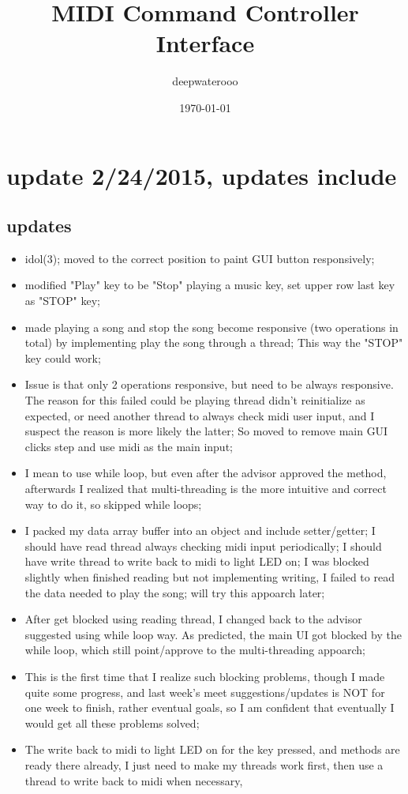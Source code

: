 \documentclass[9pt,b5paper]{article}
\author{deepwaterooo}
\date{\today}
\title{MIDI Command Controller Interface}
\begin{document}
\maketitle
\tableofcontents


\section{update 2/24/2015, updates include}
\label{sec-1}
\subsection{updates}
\label{sec-1-1}
\begin{itemize}
\item idol(3); moved to the correct position to paint GUI button responsively;
\item modified "Play" key to be "Stop" playing a music key, set upper row last key as "STOP" key;
\item made playing a song and stop the song become responsive (two operations in total) by implementing play the song through a thread; This way the "STOP" key could work;
\item Issue is that only 2 operations responsive, but need to be always responsive. The reason for this failed could be playing thread didn't reinitialize as expected, or need another thread to always check midi user input, and I suspect the reason is more likely the latter; So moved to remove main GUI clicks step and use midi as the main input;
\item I mean to use while loop, but even after the advisor approved the method, afterwards I realized that multi-threading is the more intuitive and correct way to do it, so skipped while loops;
\item I packed my data array buffer into an object and include setter/getter; I should have read thread always checking midi input periodically; I should have write thread to write back to midi to light LED on; I was blocked slightly when finished reading but not implementing writing, I failed to read the data needed to play the song; will try this appoarch later;
\item After get blocked using reading thread, I changed back to the advisor suggested using while loop way. As predicted, the main UI got blocked by the while loop, which still point/approve to the multi-threading appoarch;
\item This is the first time that I realize such blocking problems, though I made quite some progress, and last week's meet suggestions/updates is NOT for one week to finish, rather eventual goals, so I am confident that eventually I would get all these problems solved;
\item The write back to midi to light LED on for the key pressed, and methods are ready there already, I just need to make my threads work first, then use a thread to write back to midi when necessary,
\end{itemize}
\end{document}
